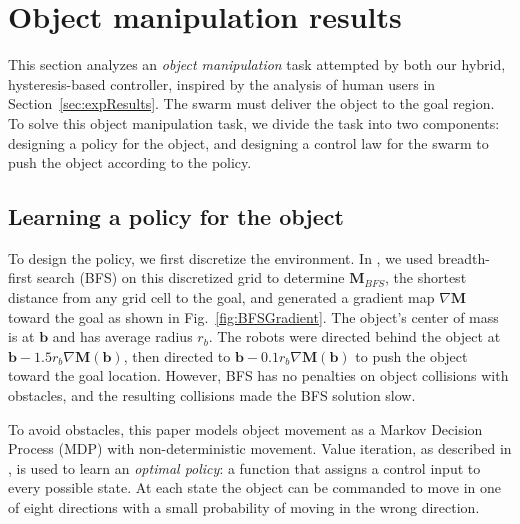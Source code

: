 
\section{Object manipulation results}\label{sec:exp}

This section analyzes an \emph{object manipulation} task attempted by both our hybrid, hysteresis-based controller, inspired by the analysis of human users in Section~\ref{sec:expResults}.  
The swarm must deliver the object to the goal region.  To solve this object manipulation task, we divide the task into two components: designing a policy for the object, and designing a control law for the swarm to push the object according to the policy.

\subsection{Learning a policy for the object}\label{subsec:objectpolicy}

To design the policy, we first discretize the environment. 
In \cite{ShahrokhiIROS2015}, we used breadth-first search (BFS) on this discretized grid to determine $\mathbf{M}_{BFS}$, the shortest distance from any grid cell to the goal, and generated a gradient map $\nabla \mathbf{M}$ toward the goal as shown in Fig.~\ref{fig:BFSGradient}.  
The object's center of mass is at $\mathbf{b}$ and has average radius $r_b$. 
The robots were directed behind the object at  $\mathbf{b} - 1.5 r_b \nabla \mathbf{M}(\mathbf{b})$, then directed to  $\mathbf{b} - 0.1 r_b \nabla \mathbf{M}(\mathbf{b})$ to push the object toward the goal location. However, BFS has no penalties on object collisions with obstacles, and the resulting collisions made the BFS solution slow.

 To avoid obstacles, this paper models object movement as a Markov Decision Process (MDP) with non-deterministic movement.  
  Value iteration,  as described in \cite{Thrun2005}, is used to learn an \emph{optimal policy}: a function that assigns a control input to every possible state.
 At each state the object can be commanded to move in one of eight directions with a small probability of moving in the wrong direction. 
 
